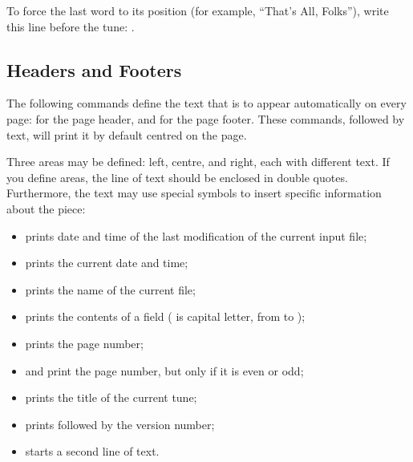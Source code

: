 \documentclass[a4paper,12pt]{book}
\begin{document}
To force the last word to its position (for example, ``That's All,
Folks''), write this line before the tune: .


\subsection{Headers and Footers}
\label{sec:headerfooter}

The following commands define the text that is to appear automatically
on every page:  for the page header, and
 for the page footer. These commands, followed by
text, will print it by default centred on the page.

Three areas may be defined: left, centre, and right, each with
different text. If you define areas, the line of text should be
enclosed in double quotes. Furthermore, the text may use special
symbols to insert specific information about the piece:

\begin{itemize}

  \item {} prints date and time of the last modification of the
  current input file;
  
  \item {} prints the current date and time;
  
  \item {} prints the name of the current file;
  
  \item {} prints the contents of a field ( is
  capital letter, from  to );
  
  \item {} prints the page number;
  
  \item {} and  print the page number, but only if it is
  even or odd;
  
  \item {} prints the title of the current tune;
  
  \item {} prints  followed by the version number;
  
  \item {} starts a second line of text.
  
\end{itemize}
\end{document}
